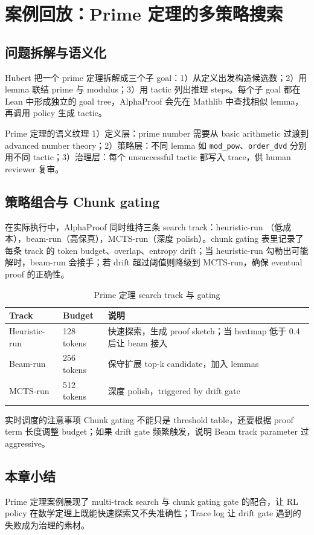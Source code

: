 \section{案例回放：Prime 定理的多策略搜索}

\subsection{问题拆解与语义化}
Hubert 把一个 prime 定理拆解成三个子 goal：1）从定义出发构造候选数；2）用 lemma 联结 prime 与 modulus；3）用 tactic 列出推理 steps。每个子 goal 都在 Lean 中形成独立的 goal tree，AlphaProof 会先在 Mathlib 中查找相似 lemma，再调用 policy 生成 tactic。

\begin{knowledgebox}{Prime 定理的语义纹理}
1）定义层：prime number 需要从 basic arithmetic 过渡到 advanced number theory；2）策略层：不同 lemma 如 \texttt{mod\_pow}、\texttt{order\_dvd} 分别用不同 tactic；3）治理层：每个 unsuccessful tactic 都写入 trace，供 human reviewer 复审。
\end{knowledgebox}

\subsection{策略组合与 Chunk gating}
在实际执行中，AlphaProof 同时维持三条 search track：heuristic-run （低成本），beam-run（高保真），MCTS-run（深度 polish）。chunk gating 表里记录了每条 track 的 token budget、overlap、entropy drift；当 heuristic-run 勾勒出可能解时，beam-run 会接手；若 drift 超过阈值则降级到 MCTS-run，确保 eventual proof 的正确性。

\begin{table}[H]
\centering
\begin{tabular}{p{3.5cm}p{3.5cm}p{5cm}}
\toprule
Track & Budget & 说明 \\
\midrule
Heuristic-run & 128 tokens & 快速探索，生成 proof sketch；当 heatmap 低于 0.4 后让 beam 接入 \\
Beam-run & 256 tokens & 保守扩展 top-k candidate，加入 lemmas \\
MCTS-run & 512 tokens & 深度 polish，triggered by drift gate \\
\bottomrule
\end{tabular}
\caption{Prime 定理 search track 与 gating}
\end{table}

\begin{warningbox}{实时调度的注意事项}
Chunk gating 不能只是 threshold table，还要根据 proof term 长度调整 budget；如果 drift gate 频繁触发，说明 Beam track parameter 过 aggressive。
\end{warningbox}

\subsection{本章小结}
Prime 定理案例展现了 multi-track search 与 chunk gating gate 的配合，让 RL policy 在数学定理上既能快速探索又不失准确性；Trace log 让 drift gate 遇到的失败成为治理的素材。
\newpage

